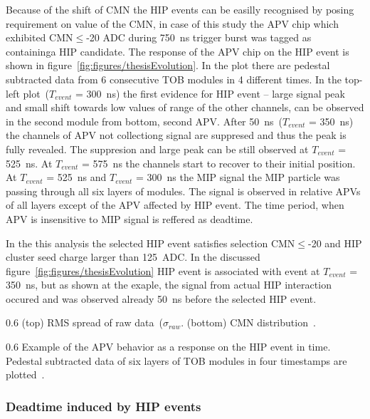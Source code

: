 Because of the shift of CMN the HIP events can be easilly recognised by posing requirement on value of the CMN, in case of this study the APV chip which exhibited CMN$\leq$-20 ADC during 750~ns trigger burst was tagged as containinga  HIP candidate. The response of the APV chip on the HIP event is shown in figure~\ref{fig:figures/thesisEvolution}. In the plot there are pedestal subtracted data from 6 consecutive TOB modules in 4 different times. In the top-left plot~($T_{event}$ = 300~ns) the first evidence for HIP event -- large signal peak and small shift towards low values of range of the other channels, can be observed in the second module from bottom, second APV. After 50~ns~($T_{event}$ = 350~ns) the channels of APV not collectiong signal are suppresed and thus the peak is fully revealed. The suppresion and large peak can be still observed at $T_{event}$ = 525~ns. At $T_{event}$ = 575~ns the channels start to recover to their initial position. At $T_{event}$ = 525~ns and $T_{event}$ = 300~ns the MIP signal the MIP particle was passing through all six layers of modules. The signal is observed in relative APVs of all layers except of the APV affected by HIP event. The time period, when APV is insensitive to MIP signal is reffered as deadtime.

In the this analysis the selected HIP event satisfies selection CMN$\leq$-20 and HIP cluster seed charge larger than 125~ADC.  In the discussed figure~\ref{fig:figures/thesisEvolution} HIP event is associated with event at $T_{event}$ = 350~ns, but as shown at the exaple, the signal from actual HIP interaction occured and was observed already 50~ns before the selected HIP event.

                 {0.6}       %
                 {(top) RMS spread of raw data~($\sigma_{raw}$. (bottom) CMN distribution~\cite{Bainbridge:2004jc}.} %


                 {0.6}       %
                 {Example of the APV behavior as a response on the HIP event in time. Pedestal subtracted data of six layers of TOB modules in four timestamps are plotted~\cite{Bainbridge:2004jc}.} %



\subsubsection{Deadtime induced by HIP events}

